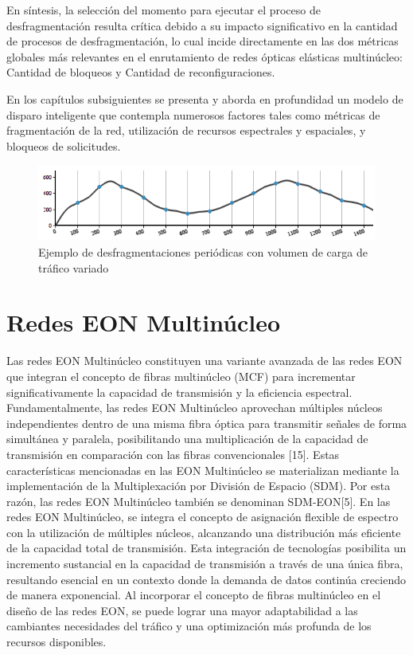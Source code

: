 En síntesis, la selección del momento para ejecutar el proceso de desfragmentación resulta crítica debido a su impacto significativo en la cantidad de procesos de desfragmentación, lo cual incide directamente en las dos métricas globales más relevantes en el enrutamiento de redes ópticas elásticas multinúcleo: Cantidad de bloqueos y Cantidad de reconfiguraciones.
%

En los capítulos subsiguientes se presenta y aborda en profundidad un modelo de disparo inteligente que contempla numerosos factores tales como métricas de fragmentación de la red, utilización de recursos espectrales y espaciales, y bloqueos de solicitudes.
%

\begin{figure}[h!]
    \centering
    \includegraphics[width=1\textwidth]{capitulos/img/ejemploPeriodico.png}
    \caption{Ejemplo de desfragmentaciones periódicas con volumen de carga de tráfico variado}
    \label{fig:ejemploPeriodico}
\end{figure}
%


\section{Redes EON Multinúcleo}
Las redes EON Multinúcleo constituyen una variante avanzada de las redes EON que integran el concepto de fibras multinúcleo (MCF) para incrementar significativamente la capacidad de transmisión y la eficiencia espectral. Fundamentalmente, las redes EON Multinúcleo aprovechan múltiples núcleos independientes dentro de una misma fibra óptica para transmitir señales de forma simultánea y paralela, posibilitando una multiplicación de la capacidad de transmisión en comparación con las fibras convencionales [15].
 Estas características mencionadas en las EON Multinúcleo se materializan mediante la implementación de la Multiplexación por División de Espacio (SDM). Por esta razón, las redes EON Multinúcleo también se denominan SDM-EON[5]. En las redes EON Multinúcleo, se integra el concepto de asignación flexible de espectro con la utilización de múltiples núcleos, alcanzando una distribución más eficiente de la capacidad total de transmisión. Esta integración de tecnologías posibilita un incremento sustancial en la capacidad de transmisión a través de una única fibra, resultando esencial en un contexto donde la demanda de datos continúa creciendo de manera exponencial.
  Al incorporar el concepto de fibras multinúcleo en el diseño de las redes EON, se puede lograr una mayor adaptabilidad a las cambiantes necesidades del tráfico y una optimización más profunda de los recursos disponibles.
%

